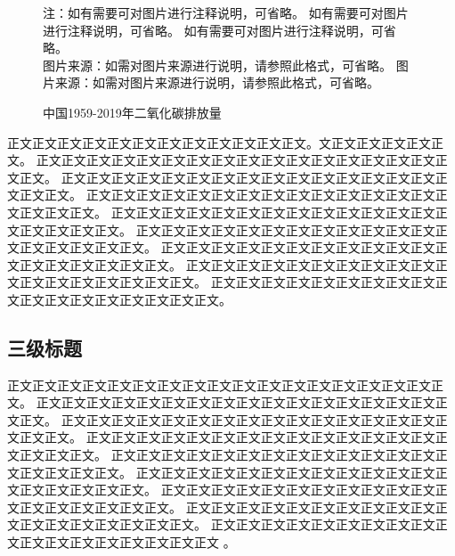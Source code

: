 \begin{figure}[H]
  \caption{中国1959-2019年二氧化碳排放量\label{fig:co2}}
  \vspace{1.5ex} 
  \begin{minipage}{\textwidth}
    \small
    \phantom{缩进}注：如有需要可对图片进行注释说明，可省略。
    如有需要可对图片进行注释说明，可省略。
    如有需要可对图片进行注释说明，可省略。\\
    \phantom{缩进}图片来源：如需对图片来源进行说明，请参照此格式，可省略。 
    图片来源：如需对图片来源进行说明，请参照此格式，可省略。 
  \end{minipage}
\end{figure}
\vspace{-3ex}
正文正文正文正文正文正文正文正文正文正文正文正文。文正文正文正文正文正文。
正文正文正文正文正文正文正文正文正文正文正文正文正文正文正文正文正文正文。
正文正文正文正文正文正文正文正文正文正文正文正文正文正文正文正文正文正文。
正文正文正文正文正文正文正文正文正文正文正文正文正文正文正文正文正文正文。
正文正文正文正文正文正文正文正文正文正文正文正文正文正文正文正文正文正文。
正文正文正文正文正文正文正文正文正文正文正文正文正文正文正文正文正文正文。
正文正文正文正文正文正文正文正文正文正文正文正文正文正文正文正文正文正文。
正文正文正文正文正文正文正文正文正文正文正文正文正文正文正文正文正文正文。
正文正文正文正文正文正文正文正文正文正文正文正文正文正文正文正文正文正文。

\subsection{三级标题}
正文正文正文正文正文正文正文正文正文正文正文正文正文正文正文正文正文正文。
正文正文正文正文正文正文正文正文正文正文正文正文正文正文正文正文正文正文。
正文正文正文正文正文正文正文正文正文正文正文正文正文正文正文正文正文正文。
正文正文正文正文正文正文正文正文正文正文正文正文正文正文正文正文正文正文。
正文正文正文正文正文正文正文正文正文正文正文正文正文正文正文正文正文正文。
正文正文正文正文正文正文正文正文正文正文正文正文正文正文正文正文正文正文。
正文正文正文正文正文正文正文正文正文正文正文正文正文正文正文正文正文正文。
正文正文正文正文正文正文正文正文正文正文正文正文正文正文正文正文正文正文。
正文正文正文正文正文正文正文正文正文正文正文正文正文正文正文正文正文正文
\cite{__2017,schmitt-grohe_covid-19_2020,__2020,__2019,__2020-1}。







